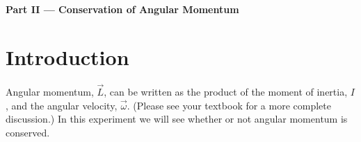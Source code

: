 %
%
%
%

\begin{center}
{\Large {\bf Part II --- Conservation of Angular Momentum}}
\end{center}
\section*{Introduction}
Angular momentum, $\vec{L}$, can be written as the product of the moment of inertia,
$I$, and the angular velocity, $\vec{\omega}$. (Please see your
textbook for a more complete discussion.) In this experiment we will
see whether or not angular momentum is conserved.

